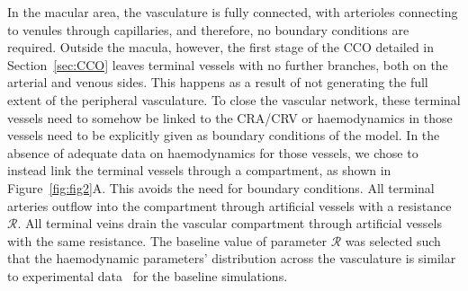 \documentclass[11pt,]{article}
\begin{document}
In the macular area, the vasculature is fully connected, with
arterioles connecting to venules through capillaries, and therefore, no boundary conditions are required.
Outside the macula, however, the first stage of the CCO detailed in
Section~\ref{sec:CCO} leaves terminal vessels with no further branches, both on the arterial and venous sides.
This happens as a result of not generating the full extent of the peripheral vasculature.
To close the vascular network, these terminal vessels need to somehow be linked to the CRA/CRV or haemodynamics in those vessels need to be explicitly given as boundary conditions of the model.
In the absence of adequate data on haemodynamics for those vessels, we chose to instead link the terminal vessels through a compartment, as shown in Figure~\ref{fig:fig2}A.
This avoids the need for boundary conditions.
All terminal arteries outflow into the compartment through artificial vessels with a resistance $\mathcal R$.
All terminal veins drain the vascular compartment through artificial vessels with the same resistance. 
The baseline value of parameter $\mathcal R$ was selected such that the haemodynamic parameters' distribution across the vasculature is similar to experimental data~\cite{DoblhoffDier2014,Riva1985} for the baseline simulations.
\end{document}
